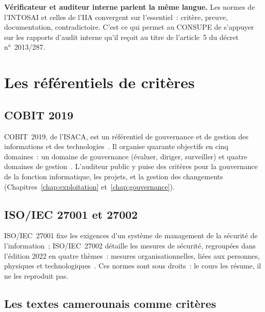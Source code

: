 \begin{boxinfo}
\textbf{Vérificateur et auditeur interne parlent la même langue.} Les
normes de l'INTOSAI et celles de l'IIA convergent sur l'essentiel~:
critère, preuve, documentation, contradictoire. C'est ce qui permet au
CONSUPE de s'appuyer sur les rapports d'audit interne qu'il reçoit au
titre de l'article~5 du décret n°~2013/287.
\end{boxinfo}

\separateur

\section{Les référentiels de critères}
\label{sec:c05-referentiels}

\subsection{COBIT 2019}

COBIT~2019, de l'ISACA, est un référentiel de gouvernance et de gestion
des informations et des technologies~\cite{isaca2018cobitintro}. Il
organise quarante objectifs en cinq domaines~: un domaine de gouvernance
(évaluer, diriger, surveiller) et quatre domaines de
gestion~\cite{isaca2018cobitobjectifs}. L'auditeur public y puise des
critères pour la gouvernance de la fonction informatique, les projets, et
la gestion des changements (Chapitres~\ref{chap:exploitation}
et~\ref{chap:gouvernance}).

\subsection{ISO/IEC 27001 et 27002}

ISO/IEC~27001 fixe les exigences d'un système de management de la
sécurité de l'information~; ISO/IEC~27002 détaille les mesures de
sécurité, regroupées dans l'édition 2022 en quatre thèmes~: mesures
organisationnelles, liées aux personnes, physiques et
technologiques~\cite{iso27001_2022,iso27002_2022}. Ces normes sont sous
droits~: le cours les résume, il ne les reproduit pas.

\subsection{Les textes camerounais comme critères}

